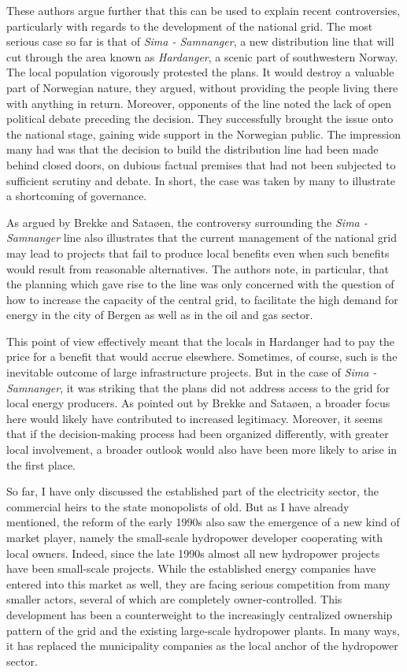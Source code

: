 These authors argue further that this can be used to explain recent controversies, particularly with regards to the development of the national grid. The most serious case so far is that of {\it Sima - Samnanger}, a new distribution line that will cut through the area known as {\it Hardanger}, a scenic part of southwestern Norway. The local population vigorously protested the plans. It would destroy a valuable part of Norwegian nature, they argued, without providing the people living there with anything in return. Moreover, opponents of the line noted the lack of open political debate preceding the decision. They successfully brought the issue onto the national stage, gaining wide support in the Norwegian public. The impression many had was that the decision to build the distribution line had been made behind closed doors, on dubious factual premises that had not been subjected to sufficient scrutiny and debate. In short, the case was taken by many to illustrate a shortcoming of governance.

As argued by Brekke and Sataøen, the controversy surrounding the {\it Sima - Samnanger} line also illustrates that the current management of the national grid may lead to projects that fail to produce local benefits even when such benefits would result from  reasonable alternatives. The authors note, in particular, that the planning which gave rise to the line was only concerned with the question of how to increase the capacity of the central grid, to facilitate the high demand for energy in the city of Bergen as well as in the oil and gas sector. 

This point of view effectively meant that the locals in Hardanger had to pay the price for a benefit that would accrue elsewhere. Sometimes, of course, such is the inevitable outcome of large infrastructure projects. But in the case of {\it Sima - Samnanger}, it was striking that the plans did not address access to the grid for local energy producers. As pointed out by Brekke and Sataøen, a broader focus here would likely have contributed to increased legitimacy. Moreover, it seems that if the decision-making process had been organized differently, with greater local involvement, a broader outlook would also have been more likely to arise in the first place.

So far, I have only discussed the established part of the electricity sector, the commercial heirs to the state monopolists of old. But as I have already mentioned, the reform of the early 1990s also saw the emergence of a new kind of market player, namely the small-scale hydropower developer cooperating with local owners. Indeed, since the late 1990s almost all new hydropower projects have been small-scale projects. While the established energy companies have entered into this market as well, they are facing serious competition from many smaller actors, several of which are completely owner-controlled. This development has been a counterweight to the increasingly centralized ownership pattern of the grid and the existing large-scale hydropower plants. In many ways, it has replaced the municipality companies as the local anchor of the hydropower sector. 

